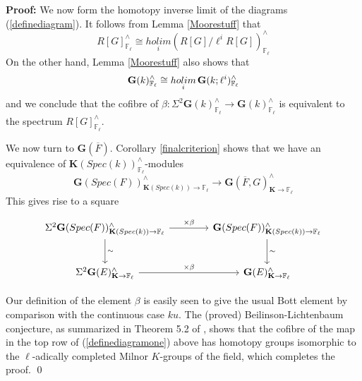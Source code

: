 \documentclass[11pt]{article}
\newcommand\mb{\mathbb}
\def \bK{\mathbf K}
\newcommand\mfk{\mathbf G}
\newenvironment{Proof}{\par\noindent\textbf{Proof:}}
{\qed}
\begin{document}
\begin{Proof}
We now form the homotopy inverse limit of the diagrams (\ref{definediagram}). It follows from Lemma \ref{Moorestuff} that 
$$ R[G]^{\wedge}_{\mb{F}_{\ell}} \cong \underset{i }{holim}(R[G]/\ell ^i R[G])^{\wedge}_{\mb{F}_{\ell}}
$$
On the other hand, Lemma \ref{Moorestuff} also shows that
$$\mfk(k)^{\wedge}_{\mb{F}_{\ell}} \cong \underset{i}{holim} \hspace{.05cm}\mfk(k; \ell ^i)^{\wedge}_{\mb{F}_{\ell}} $$
and we conclude that the cofibre of $\beta: \Sigma ^2 \mfk (k)^{\wedge}_{\mb{F}_{\ell}} \rightarrow \mfk (k)^{\wedge}_{\mb{F}_{\ell}}$ is equivalent to the spectrum $R[G]^{\wedge}_{\mb{F}_{\ell}}$.  

We now turn to $\mfk(\overline{F})$.  Corollary \ref{finalcriterion} shows that we have an equivalence of $\bK(Spec(k))^{\wedge}_{\mb{F}_{\ell}}$-modules  
$$\mfk(Spec(F))^{\wedge}_{\bK(Spec(k)) \rightarrow \mb{F}_{\ell}} \rightarrow \mfk(\overline{F},G)^{\wedge} _{\bK\rightarrow \mb{F}_{\ell}} $$
This gives rise to a square
\vspace{-1cm}
\begin{center}
\begin{equation} \label{definediagramone}
\begin{tikzcd}[row sep=2.5em, column sep=4em]
\Sigma ^2 \mfk (Spec(F))^{\wedge}_{\bK(Spec(k))\rightarrow \mb{F}_{\ell} } \arrow[r,"\times \beta"] \arrow[d, "\sim"] & \mfk (Spec(F)) ^{\wedge} _{\bK(Spec(k))\rightarrow \mb{F}_{\ell}} \arrow[d,"\sim"]
 \\
\Sigma ^2 \mfk (E)^{\wedge}_{\bK \rightarrow \mb{F}_{\ell}}
\arrow[r, "\times \beta"] & \mfk (E)^{\wedge}_{\bK \rightarrow \mb{F}_{\ell}} 
\end{tikzcd}
\end{equation}
\end{center}
Our definition of the element $\beta$ is easily seen to give the usual Bott element by comparison with the continuous case $ku$.  The (proved) Beilinson-Lichtenbaum conjecture, as summarized in Theorem 5.2 of \cite{repassembly}, shows that the cofibre of the map in the top row of (\ref{definediagramone}) above has homotopy groups isomorphic to the $\ell$-adically completed Milnor $K$-groups of the field, which completes the proof.    
\end{Proof}
\end{document}
